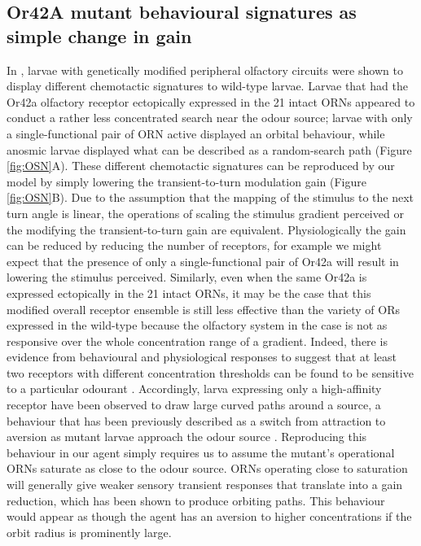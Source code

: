 \documentclass[11pt,a4paper]{article}
\begin{document}
\subsection{Or42A mutant behavioural signatures as simple change in gain}
In \cite{gomez2011active}, larvae with genetically modified peripheral olfactory circuits were shown to display different chemotactic signatures to wild-type larvae.
 Larvae that had the Or42a olfactory receptor ectopically expressed in the 21 intact ORNs appeared to conduct a rather less concentrated search near the odour source; larvae with only a single-functional pair of ORN active displayed an orbital behaviour, while anosmic larvae displayed what can be described as a random-search path (Figure \ref{fig:OSN}A).
 These different chemotactic signatures can be reproduced by our model by simply lowering the transient-to-turn modulation gain 
 (Figure \ref{fig:OSN}B).
 Due to the assumption that the mapping of the stimulus to the next turn angle is linear, the operations of  scaling the stimulus gradient perceived or the modifying the transient-to-turn gain are equivalent.
  Physiologically the gain can be reduced by reducing the number of receptors, for example we might expect that the presence of only a single-functional pair of Or42a will result in lowering the stimulus perceived.
 Similarly, even when the same Or42a is expressed ectopically in the 21 intact ORNs, it may be the case that this modified overall receptor ensemble is still less effective than the variety of ORs expressed in the wild-type because the olfactory system in the case is not as responsive over the whole concentration range of a gradient. Indeed, there is evidence from behavioural and physiological responses to suggest that at least two receptors with different concentration thresholds can be found to be sensitive to a particular odourant \citep{kreher2008translation}. 
Accordingly, larva expressing only a high-affinity receptor have been observed to draw large curved paths around a source, a behaviour that has been previously described as a switch from attraction to aversion as mutant larvae approach the odour source \citep{gomez2011active, kreher2008translation}. %
  Reproducing this behaviour in our agent simply requires us to assume the mutant's operational ORNs saturate as close to the odour source. ORNs operating close to saturation will generally give weaker sensory transient responses that translate into a gain reduction, which has been shown to produce orbiting paths. This behaviour would appear as though the agent has an aversion to higher concentrations if the orbit radius is prominently large.
 
\end{document}
